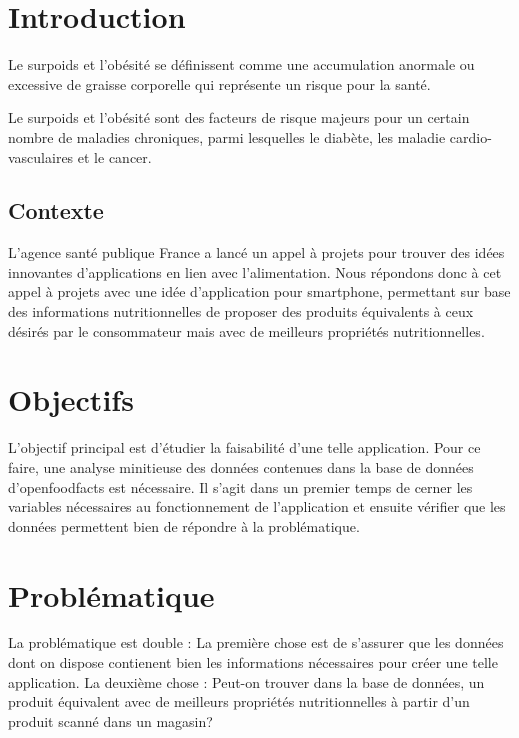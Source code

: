 
\section{Introduction}

  Le surpoids et l'obésité se définissent comme une accumulation anormale ou
  excessive de graisse corporelle qui représente un risque pour la santé.

  Le surpoids et l'obésité sont des facteurs de risque majeurs pour un certain
  nombre de maladies chroniques, parmi lesquelles le diabète, les maladie
  cardio-vasculaires et le cancer. \cite{OMS}

  \subsection{Contexte}

  L'agence santé publique France a lancé un appel à projets pour trouver des
  idées innovantes d'applications en lien avec l'alimentation. Nous répondons
  donc à cet appel à projets avec une idée d'application pour smartphone,
  permettant sur base des informations nutritionnelles de proposer des
  produits équivalents à ceux désirés par le consommateur mais avec de meilleurs
  propriétés nutritionnelles.

\section{Objectifs}

L'objectif principal est d'étudier la faisabilité d'une telle application. Pour
ce faire, une analyse minitieuse des données contenues dans la base de données
d'openfoodfacts est nécessaire. Il s'agit dans un premier temps de cerner les
variables nécessaires au fonctionnement de l'application et ensuite vérifier
que les données permettent bien de répondre à la problématique.

\section{Problématique}

La problématique est double :\newline
La première chose est de s'assurer que les données dont on dispose contienent
bien les informations nécessaires pour créer une telle application.\newline
La deuxième chose :\newline
Peut-on trouver dans la base de données, un produit équivalent avec
de meilleurs propriétés nutritionnelles à partir d'un produit scanné dans
un magasin?

